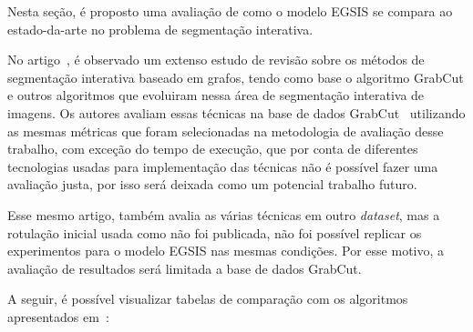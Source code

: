 Nesta seção, é proposto uma avaliação de como o modelo \gls{EGSIS} se
compara ao estado-da-arte no problema de segmentação interativa.

No artigo~\cite{wang2023review}, é observado um extenso estudo de
revisão sobre os métodos de segmentação interativa baseado em grafos,
tendo como base o algoritmo GrabCut e outros algoritmos que evoluiram
nessa área de segmentação interativa de imagens. Os autores avaliam
essas técnicas na base de dados GrabCut~\cite{rother2004grabcut}
utilizando as mesmas métricas que foram selecionadas na metodologia de
avaliação desse trabalho, com exceção do tempo de execução, que por
conta de diferentes tecnologias usadas para implementação das técnicas
não é possível fazer uma avaliação justa, por isso será deixada como
um potencial trabalho futuro.

Esse mesmo artigo, também avalia as várias técnicas em outro \textit{dataset},
mas a rotulação inicial usada como não foi publicada, não foi possível
replicar os experimentos para o modelo \gls{EGSIS} nas mesmas
condições. Por esse motivo, a avaliação de resultados será limitada a
base de dados GrabCut.

A seguir, é possível visualizar tabelas de comparação com os
algoritmos apresentados em~\cite{wang2023review}:


